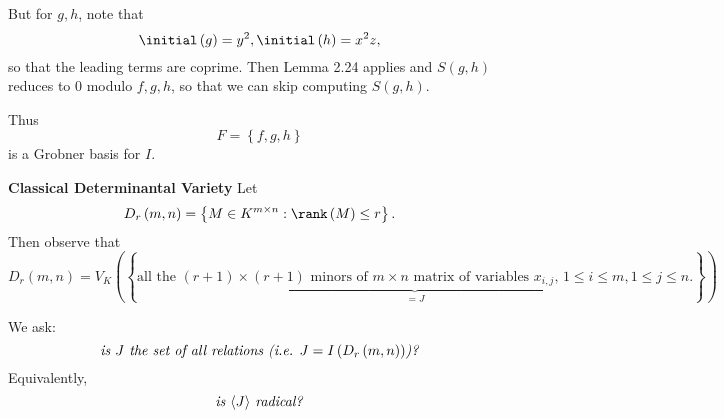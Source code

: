 \documentclass[co439]{subfiles}
\begin{document}
\begin{example}{}
        But for $g,h$, note that
        \begin{equation*}
            \initial\left( g \right) = y^{2}, \initial\left( h \right) = x^{2}z,
        \end{equation*}
        so that the leading terms are coprime. Then Lemma 2.24 applies and $S\left( g,h \right)$ reduces to $0$ modulo $f,g,h$, so that we can skip computing $S\left( g,h \right)$.

        Thus
        \begin{equation*}
            F = \left\lbrace f,g,h \right\rbrace
        \end{equation*}
        is a Grobner basis for $I$.
    \end{example}

    \rruleline
    
    \begin{example}{\textbf{Classical Determinantal Variety}}
        Let
        \begin{equation*}
            D_r\left( m,n \right) = \left\lbrace M\in K^{m\times n}: \rank\left( M \right)\leq r \right\rbrace.
        \end{equation*}
        Then observe that
        \begin{equation*}
            D_r\left( m,n \right) = V_K\left( \left\lbrace \underbrace{\text{all the $\left( r+1 \right)\times\left( r+1 \right)$ minors of $m\times n$ matrix of variables $x_{i,j}$, $1\leq i\leq m, 1\leq j\leq n$.}}_{=J} \right\rbrace \right)
        \end{equation*}

        We ask:
        \begin{equation*}
            \text{\textit{is $J$ the set of all relations (i.e. $J=I\left( D_r\left( m,n \right) \right)$)?}}
        \end{equation*}
        Equivalently,
        \begin{equation*}
            \text{\textit{is $\left< J \right> $ radical?}}
        \end{equation*}


\end{example}
\end{document}
